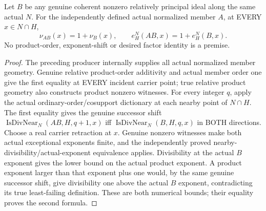 \begin{theorem}
\label{hir:sharp-actual-transverse-member-product-exponent-add-one}
\leanok
Let $B$ be any genuine coherent nonzero relatively principal ideal along
the same actual $N$. For the independently defined actual normalized
member $A$, at EVERY $x\in N\cap H$,
\[
 \nu_{AB}(x)=1+\nu_B(x),\qquad
 e_H^N(AB,x)=1+e_H^N(B,x).
\]
No product-order, exponent-shift or desired factor identity is a premise.
\end{theorem}
\begin{proof}
The preceding producer internally supplies all actual normalized member
geometry. Genuine relative product-order additivity and actual member
order one give the first equality at EVERY incident carrier point; true
relative product geometry also constructs product nonzero witnesses.
For every integer $q$, apply the actual ordinary-order/cosupport
dictionary at each nearby point of $N\cap H$. The first equality gives
the genuine successor shift
$\operatorname{IsDivNear}_N(AB,H,q+1,x)$ iff
$\operatorname{IsDivNear}_N(B,H,q,x)$ in BOTH directions.
Choose a real carrier retraction at $x$. Genuine nonzero witnesses make
both actual exceptional exponents finite, and the independently proved
nearby-divisibility/actual-exponent equivalence applies. Divisibility at
the actual $B$ exponent gives the lower bound on the actual product
exponent. A product exponent larger than that exponent plus one would,
by the same genuine successor shift, give divisibility one above the
actual $B$ exponent, contradicting its true least-failing definition.
These are both numerical bounds; their equality proves the second
formula.
\end{proof}


